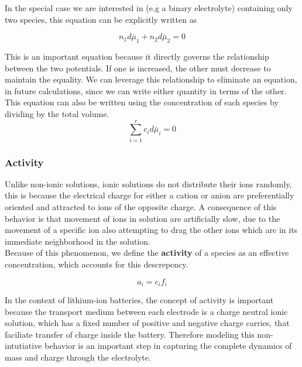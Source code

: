 \documentclass[lettersize,journal]{IEEEtran}
\begin{document}
In the special case we are interested in (e.g a binary electrolyte) containing only two species, this equation can be explicitly written as

\begin{equation}\label{gibbs_duhem_eqn}
  n_1 d\bar{\mu}_1 + n_2 d\bar{\mu}_2 = 0
\end{equation}

This is an important equation because it directly governs the relationship between the two potentials. If one is increased, the other must decrease to maintain the equality. We can leverage this relationship to eliminate an equation, in future calculations, since we can write either quantity in terms of the other. This equation can also be written using the concentration of each species by dividing by the total volume.
\begin{equation}
  \sum_{i=1}^{r} c_{i}d\bar{\mu}_i = 0
\end{equation}

\subsubsection{Activity}

Unlike non-ionic solutions, ionic solutions do not distribute their ions randomly, this is because the electrical charge for either a cation or anion are preferentially oriented and attracted to ions of the opposite charge. A consequence of this behavior is that movement of ions in solution are artificially slow, due to the movement of a specific ion also attempting to drag the other ions which are in its immediate neighborhood in the solution. \\

Because of this phenomenon, we define the \textbf{activity} of a species as an effective concentration, which accounts for this descrepency.

\begin{equation}\label{activity}
  a_i = c_i f_i
\end{equation}

In the context of lithium-ion batteries, the concept of activity is important because the transport medium between each electrode is a charge neutral ionic solution, which has a fixed number of positive and negative charge carries, that faciliate transfer of charge inside the battery. Therefore modeling this non-intutiative behavior is an important step in capturing the complete dynamics of mass and charge through the electrolyte. \\
\end{document}
